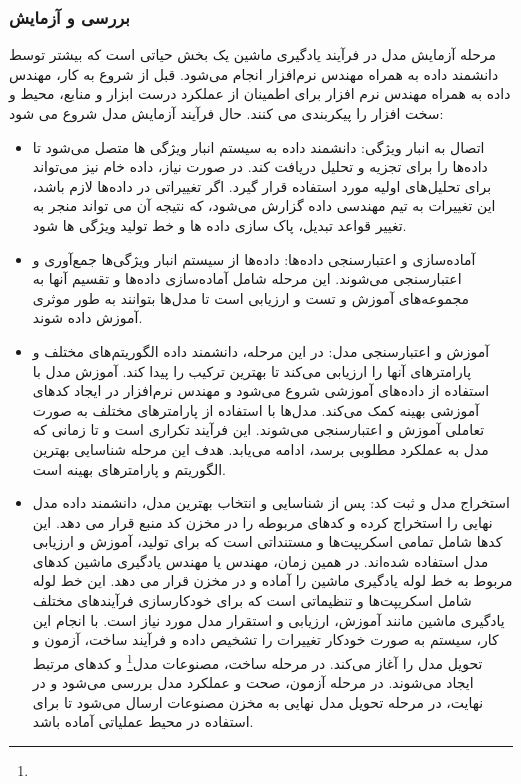 \subsubsection{بررسی و آزمایش}
مرحله آزمایش مدل در فرآیند یادگیری ماشین یک بخش حیاتی است که بیشتر توسط دانشمند داده به همراه مهندس نرم‌افزار انجام می‌شود. قبل از شروع به کار، مهندس داده به همراه مهندس نرم افزار برای اطمینان از عملکرد درست ابزار و منابع، محیط و سخت افزار را پیکربندی می کنند. حال فرآیند آزمایش مدل شروع می شود:
\begin{itemize}
	\item 
اتصال به انبار ویژگی: 
دانشمند داده به سیستم انبار ویژگی‌ ها متصل می‌شود تا داده‌ها را برای تجزیه و تحلیل دریافت کند. در صورت نیاز، داده خام نیز می‌تواند برای تحلیل‌های اولیه مورد استفاده قرار گیرد. اگر تغییراتی در داده‌ها لازم باشد، این تغییرات به تیم مهندسی داده گزارش می‌شود، که نتیجه آن می تواند منجر به تغییر قواعد تبدیل، پاک سازی داده ها و خط تولید ویژگی ها شود.
	\item 
آماده‌سازی و اعتبارسنجی داده‌ها: 
داده‌ها از سیستم انبار ویژگی‌ها جمع‌آوری و اعتبارسنجی می‌شوند. این مرحله شامل آماده‌سازی داده‌ها و تقسیم آنها به مجموعه‌های آموزش و تست و ارزیابی است تا مدل‌ها بتوانند به طور موثری آموزش داده شوند.
	\item 
آموزش و اعتبارسنجی مدل: 
در این مرحله، دانشمند داده الگوریتم‌های مختلف و پارامترهای آنها را ارزیابی می‌کند تا بهترین ترکیب را پیدا کند. آموزش مدل با استفاده از داده‌های آموزشی شروع می‌شود و مهندس نرم‌افزار در ایجاد کدهای آموزشی بهینه کمک می‌کند. مدل‌ها با استفاده از پارامترهای مختلف به صورت تعاملی آموزش و اعتبارسنجی می‌شوند. این فرآیند تکراری است و تا زمانی که مدل به عملکرد مطلوبی برسد، ادامه می‌یابد. هدف این مرحله شناسایی بهترین الگوریتم و پارامترهای بهینه است. 
	\item 
	استخراج مدل و ثبت کد: 
	پس از شناسایی و انتخاب بهترین مدل، دانشمند داده مدل نهایی را استخراج کرده و کدهای مربوطه را در مخزن کد منبع قرار می دهد. این کدها شامل تمامی اسکریپت‌ها و مستنداتی است که برای تولید، آموزش و ارزیابی مدل استفاده شده‌اند. در همین زمان، مهندس  یا مهندس یادگیری ماشین کدهای مربوط به خط لوله یادگیری ماشین را آماده و در مخزن قرار می دهد. این خط لوله شامل اسکریپت‌ها و تنظیماتی است که برای خودکارسازی فرآیندهای مختلف یادگیری ماشین مانند آموزش، ارزیابی و استقرار مدل مورد نیاز است. با انجام این کار، سیستم  به صورت خودکار تغییرات را تشخیص داده و فرآیند ساخت، آزمون و تحویل مدل را آغاز می‌کند. در مرحله ساخت، مصنوعات مدل\footnote{} و کدهای مرتبط ایجاد می‌شوند. در مرحله آزمون، صحت و عملکرد مدل بررسی می‌شود و در نهایت، در مرحله تحویل مدل نهایی به مخزن مصنوعات ارسال می‌شود تا برای استفاده در محیط عملیاتی آماده باشد.	
\end{itemize}

